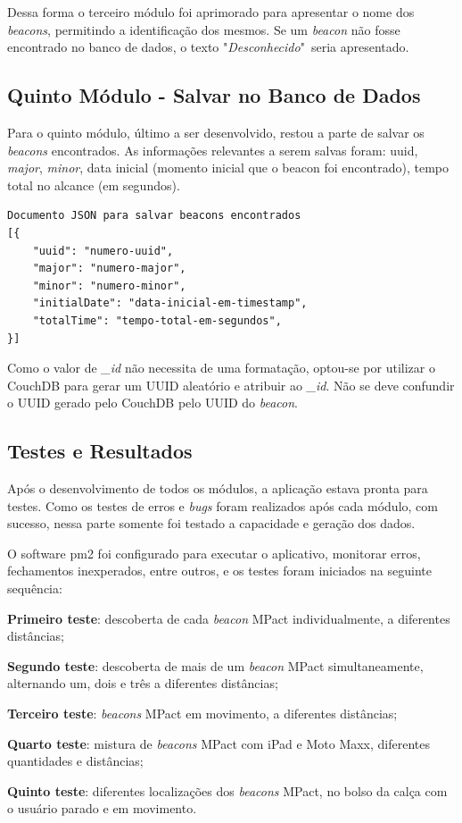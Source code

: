 Dessa forma o terceiro módulo foi aprimorado para apresentar o nome dos \textit{beacons}, permitindo a identificação dos mesmos. Se um \textit{beacon} não fosse encontrado no banco de dados, o texto "\textit{Desconhecido}"\ seria apresentado.

\subsection{Quinto Módulo - Salvar no Banco de Dados}\label{sec:quinto-modulo}

Para o quinto módulo, último a ser desenvolvido, restou a parte de salvar os \textit{beacons} encontrados. As informações relevantes a serem salvas foram: uuid, \textit{major}, \textit{minor}, data inicial (momento inicial que o beacon foi encontrado), tempo total no alcance (em segundos). 

\begin{verbatim}
Documento JSON para salvar beacons encontrados
[{
    "uuid": "numero-uuid",
    "major": "numero-major",
    "minor": "numero-minor",
    "initialDate": "data-inicial-em-timestamp",
    "totalTime": "tempo-total-em-segundos",
}]
\end{verbatim}

Como o valor de \textit{\_id} não necessita de uma formatação, optou-se por utilizar o CouchDB para gerar um UUID aleatório e atribuir ao \textit{\_id}. Não se deve confundir o UUID gerado pelo CouchDB pelo UUID do \textit{beacon}.

\subsection{Testes e Resultados}\label{sec:testes-resultados}

Após o desenvolvimento de todos os módulos, a aplicação estava pronta para testes. Como os testes de erros e \textit{bugs} foram realizados após cada módulo, com sucesso, nessa parte somente foi testado a capacidade e geração dos dados.

O software pm2 foi configurado para executar o aplicativo, monitorar erros, fechamentos inexperados, entre outros, e os testes foram iniciados na seguinte sequência:

\begin{alineas}
	\item \textbf{Primeiro teste}: descoberta de cada \textit{beacon} MPact individualmente, a diferentes distâncias;
	\item \textbf{Segundo teste}: descoberta de mais de um \textit{beacon} MPact simultaneamente, alternando um, dois e três a diferentes distâncias;
	\item \textbf{Terceiro teste}: \textit{beacons} MPact em movimento, a diferentes distâncias;
	\item \textbf{Quarto teste}: mistura de \textit{beacons} MPact com iPad e Moto Maxx, diferentes quantidades e distâncias;
	\item \textbf{Quinto teste}: diferentes localizações dos \textit{beacons} MPact, no bolso da calça com o usuário parado e em movimento.
\end{alineas}

